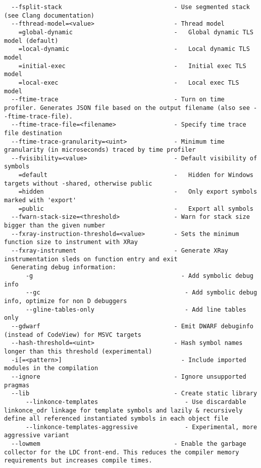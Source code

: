 \documentclass{studrep}
\begin{document}
\begin{verbatim}
  --fsplit-stack                               - Use segmented stack (see Clang documentation)
  --fthread-model=<value>                      - Thread model
    =global-dynamic                            -   Global dynamic TLS model (default)
    =local-dynamic                             -   Local dynamic TLS model
    =initial-exec                              -   Initial exec TLS model
    =local-exec                                -   Local exec TLS model
  --ftime-trace                                - Turn on time profiler. Generates JSON file based on the output filename (also see --ftime-trace-file).
  --ftime-trace-file=<filename>                - Specify time trace file destination
  --ftime-trace-granularity=<uint>             - Minimum time granularity (in microseconds) traced by time profiler
  --fvisibility=<value>                        - Default visibility of symbols
    =default                                   -   Hidden for Windows targets without -shared, otherwise public
    =hidden                                    -   Only export symbols marked with 'export'
    =public                                    -   Export all symbols
  --fwarn-stack-size=<threshold>               - Warn for stack size bigger than the given number
  --fxray-instruction-threshold=<value>        - Sets the minimum function size to instrument with XRay
  --fxray-instrument                           - Generate XRay instrumentation sleds on function entry and exit
  Generating debug information:
      -g                                         - Add symbolic debug info
      --gc                                        - Add symbolic debug info, optimize for non D debuggers
      --gline-tables-only                         - Add line tables only
  --gdwarf                                     - Emit DWARF debuginfo (instead of CodeView) for MSVC targets
  --hash-threshold=<uint>                      - Hash symbol names longer than this threshold (experimental)
  -i[=<pattern>]                                 - Include imported modules in the compilation
  --ignore                                     - Ignore unsupported pragmas
  --lib                                        - Create static library
      --linkonce-templates                        - Use discardable linkonce_odr linkage for template symbols and lazily & recursively define all referenced instantiated symbols in each object file
      --linkonce-templates-aggressive             - Experimental, more aggressive variant
  --lowmem                                     - Enable the garbage collector for the LDC front-end. This reduces the compiler memory requirements but increases compile times.

\end{verbatim}
\end{document}

